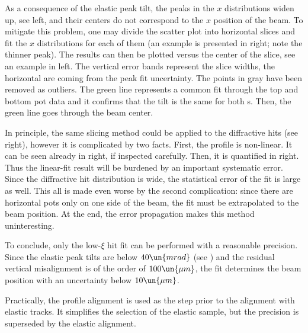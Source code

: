 As a consequence of the elastic peak tilt, the peaks in the $x$ distributions widen up, see  left, and their centers do not correspond to the $x$ position of the beam. To mitigate this problem, one may divide the scatter plot into horizontal slices and fit the $x$ distributions for each of them (an example is presented in  right; note the thinner peak). The results can then be plotted versus the center of the slice, see an example in  left. The vertical error bands represent the slice widths, the horizontal are coming from the peak fit uncertainty. The points in gray have been removed as outliers. The green line represents a common fit through the top and bottom pot data and it confirms that the tilt is the same for both s. Then, the green line goes through the beam center.


In principle, the same slicing method could be applied to the diffractive hits (see  right), however it is complicated by two facts. First, the profile is non-linear. It can be seen already in  right, if inspected carefully.  Then, it is quantified in  right. Thus the linear-fit result will be burdened by an important systematic error. Since the diffractive hit distribution is wide, the statistical error of the fit is large as well. This all is made even worse by the second complication: since there are horizontal pots only on one side of the beam, the fit must be extrapolated to the beam position. At the end, the error propagation makes this method uninteresting.


To conclude, only the low-$\xi$ hit fit can be performed with a reasonable precision. Since the elastic peak tilts are below $40\un{mrad}$ (see ) and the residual vertical misalignment is of the order of $100\un{\mu m}$, the fit determines the beam position with an uncertainty below $10\un{\mu m}$.


Practically, the profile alignment is used as the step prior to the alignment with elastic tracks. It simplifies the selection of the elastic sample, but the precision is superseded by the elastic alignment.

